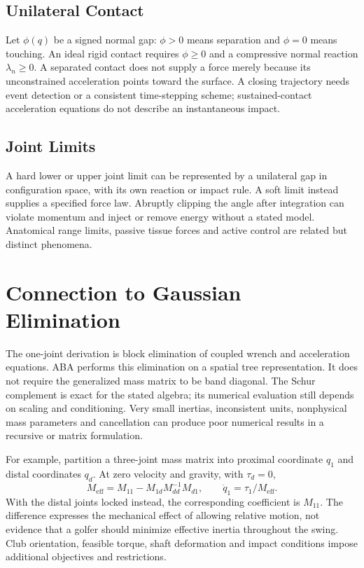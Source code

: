 \subsection{Unilateral Contact}
\label{subsec:contact}

Let $\phi(q)$ be a signed normal gap: $\phi>0$ means separation and $\phi=0$ means touching. An ideal rigid contact requires $\phi\ge0$ and a compressive normal reaction $\lambda_n\ge0$. A separated contact does not supply a force merely because its unconstrained acceleration points toward the surface. A closing trajectory needs event detection or a consistent time-stepping scheme; sustained-contact acceleration equations do not describe an instantaneous impact.

\subsection{Joint Limits}
\label{subsec:joint_limits}

A hard lower or upper joint limit can be represented by a unilateral gap in configuration space, with its own reaction or impact rule. A soft limit instead supplies a specified force law. Abruptly clipping the angle after integration can violate momentum and inject or remove energy without a stated model. Anatomical range limits, passive tissue forces and active control are related but distinct phenomena.

\section{Connection to Gaussian Elimination}
\label{sec:gaussian_elimination_connection}

The one-joint derivation is block elimination of coupled wrench and acceleration equations. ABA performs this elimination on a spatial tree representation. It does not require the generalized mass matrix to be band diagonal. The Schur complement is exact for the stated algebra; its numerical evaluation still depends on scaling and conditioning. Very small inertias, inconsistent units, nonphysical mass parameters and cancellation can produce poor numerical results in a recursive or matrix formulation.

For example, partition a three-joint mass matrix into proximal coordinate $q_1$ and distal coordinates $q_d$. At zero velocity and gravity, with $\tau_d=0$,
\begin{equation}
 M_{\mathrm{eff}}=M_{11}-M_{1d}M_{dd}^{-1}M_{d1},\qquad
 \ddot q_1=\tau_1/M_{\mathrm{eff}}.
\end{equation}
With the distal joints locked instead, the corresponding coefficient is $M_{11}$. The difference expresses the mechanical effect of allowing relative motion, not evidence that a golfer should minimize effective inertia throughout the swing. Club orientation, feasible torque, shaft deformation and impact conditions impose additional objectives and restrictions.

